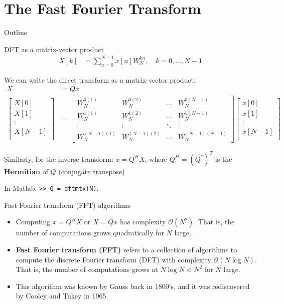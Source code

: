 \documentclass[10pt, handout]{beamer}
\begin{document}
%
\section{The Fast Fourier Transform}
\begin{frame}{Outline}
	\tableofcontents[currentsection]
\end{frame}

\begin{frame}{DFT as a matrix-vector product}
\begin{align}
X[k] &= \sum_{n = 0}^{N-1}x[n]W_N^{kn}, \quad k = 0, \ldots, N-1 \tag{direct transform}
\end{align}

We can write the direct transform as a matrix-vector product:
\begin{align*}
X &= Qx \\
\begin{bmatrix}
X[0] \\
X[1] \\
\vdots \\
X[N-1] \\
\end{bmatrix} &= \begin{bmatrix}
W_N^{0(1)} & W_N^{0(2)} & \ldots & W_N^{0(N-1)} \\
W_N^{1(1)} & W_N^{1(2)} & \ldots & W_N^{1(N-1)} \\
\vdots & \vdots & \ddots & \vdots \\
W_N^{(N-1)(1)} & W_N^{(N-1)(2)} & \ldots & W_N^{(N-1)(N-1)}
\end{bmatrix}\begin{bmatrix}
x[0] \\
x[1] \\
\vdots \\
x[N-1] \\
\end{bmatrix}
\end{align*}

Similarly, for the inverse transform: $x = Q^HX$, where $Q^H = (Q^*)^T$ is the \textbf{Hermitian} of $Q$ (conjugate transpose)

\vspace{0.25cm}
In Matlab: \texttt{>> Q = dftmtx(N)}.
\end{frame}

%
\begin{frame}{Fast Fourier transform (FFT) algorithms}
\begin{itemize}
	\item Computing $x = Q^HX$ or $X = Qx$ has complexity $\mathcal{O}(N^2)$. That is, the number of computations grows quadratically for $N$ large.
	\item \textbf{Fast Fourier transform (FFT)} refers to a collection of algorithms to compute the discrete Fourier transform (DFT) with complexity $\mathcal{O}(N\log N)$. That is, the number of computations grows at $N\log N < N^2$ for $N$ large.
	\item This algorithm was known by Gauss back in 1800's, and it was rediscovered by Cooley and Tukey in 1965.
\end{itemize}
\end{frame}
\end{document}
